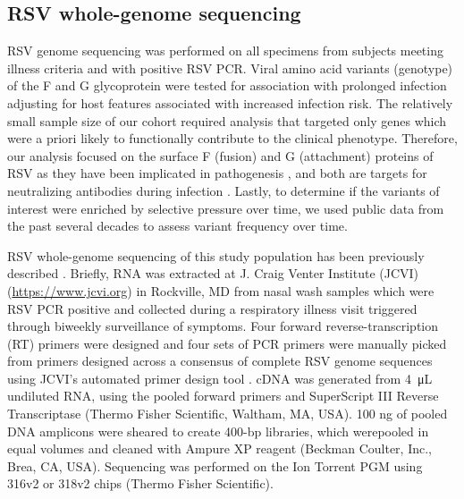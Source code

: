 \documentclass{article} %
\begin{document}
\subsection{RSV whole-genome sequencing}
RSV genome sequencing was performed on all specimens from subjects meeting illness criteria and with positive RSV PCR. 
Viral amino acid variants (genotype) of the F and G glycoprotein were tested for association with prolonged infection adjusting for host features associated with increased infection risk. 
The relatively small sample size of our cohort required analysis that targeted only genes which were a priori likely to functionally contribute to the clinical phenotype. 
Therefore, our analysis focused on the surface F (fusion) and G (attachment) proteins of RSV as they have been implicated in pathogenesis
\citep{boyoglu2015anti, bukreyev2012secreted},
and both are targets for neutralizing antibodies during infection 
\citep{anderson1988neutralization, ngwuta2015prefusion}. 
Lastly, to determine if the variants of interest were enriched by selective pressure over time, we used public data from the past several decades to assess variant frequency over time.

RSV whole-genome sequencing of this study population has been previously described 
\citep{schobel_respiratory_2016}.
Briefly, RNA was extracted at J. Craig Venter Institute (JCVI) (\url{https://www.jcvi.org}) in Rockville, MD from nasal wash samples which were RSV PCR positive and collected during a respiratory illness visit triggered through biweekly surveillance of symptoms. 
Four forward reverse-transcription (RT) primers were designed and four sets of PCR primers were manually picked from primers designed across a consensus of complete RSV genome sequences using JCVI’s automated primer design tool
\citep{li_automated_2012}.
cDNA was generated from \SI{4}{\micro\liter}  undiluted RNA, using the pooled forward primers and SuperScript III Reverse Transcriptase (Thermo Fisher Scientific, Waltham, MA, USA). 
100 ng of pooled DNA amplicons were sheared to create 400-bp libraries, which werepooled in equal volumes and cleaned with Ampure XP reagent (Beckman Coulter, Inc., Brea, CA, USA). 
Sequencing was performed on the Ion Torrent PGM using 316v2 or 318v2 chips (Thermo Fisher Scientific).
\end{document}

